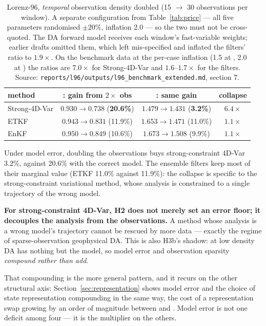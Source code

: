 \begin{table}[t]
\centering
\small
\begin{tabular}{@{}lccc@{}}
\toprule
\textbf{method} & \textbf{\Sz{}: gain from $2\times$ obs} & \textbf{\So{}: same gain} & \textbf{collapse} \\
\midrule
Strong-4D-Var & $0.930 \to 0.738$ (\textbf{20.6\%}) & $1.479 \to 1.431$ (\textbf{3.2\%}) & $\mathbf{6.4\times}$ \\
ETKF          & $0.943 \to 0.831$ (11.9\%)          & $1.653 \to 1.471$ (11.0\%)         & $1.1\times$ \\
EnKF          & $0.950 \to 0.849$ (10.6\%)          & $1.673 \to 1.508$ (9.9\%)          & $1.1\times$ \\
\bottomrule
\end{tabular}
\caption{Lorenz-96, \emph{temporal} observation density doubled (15 $\to$ 30
observations per window). A separate configuration from Table~\ref{tab:price}
--- all five parameters randomised $\pm 20\%$, inflation 2.0 --- so the two must
not be cross-quoted. The DA forward model receives each window's fast-variable
weights; earlier drafts omitted them, which left \Sz{} mis-specified and inflated
the filters' ratio to $1.9\times$. On the benchmark data at the per-case
inflation (1.5 at \Sz{}, 2.0 at \So{}) the ratios are $7.0\times$ for
Strong-4D-Var and $1.6$--$1.7\times$ for the filters. Source:
\texttt{reports/l96/outputs/l96\_benchmark\_extended.md}, section 7.}
\label{tab:marginal}
\end{table}

Under model error, doubling the observations buys strong-constraint 4D-Var
3.2\%, against 20.6\% with the correct model. The ensemble filters keep most of
their marginal value (ETKF 11.0\% against 11.9\%): the collapse is specific to the
strong-constraint variational method, whose analysis is constrained to a single
trajectory of the wrong model.

\textbf{For strong-constraint 4D-Var, H2 does not merely set an error floor; it
decouples the analysis from the observations.} A method whose analysis is a wrong
model's trajectory cannot be rescued by more data --- exactly the regime of
sparse-observation geophysical DA. This is also
H3b's shadow: at low density DA has nothing but the model, so model error and
observation sparsity \emph{compound rather than add}.

That compounding is the more general pattern, and it recurs on the other
structural axis: Section~\ref{sec:representation} shows model error and the
choice of state representation compounding in the same way, the cost of a
representation swap growing by an order of magnitude between \Sz{} and \So{}.
Model error is not one deficit among four --- it is the multiplier on the
others.

